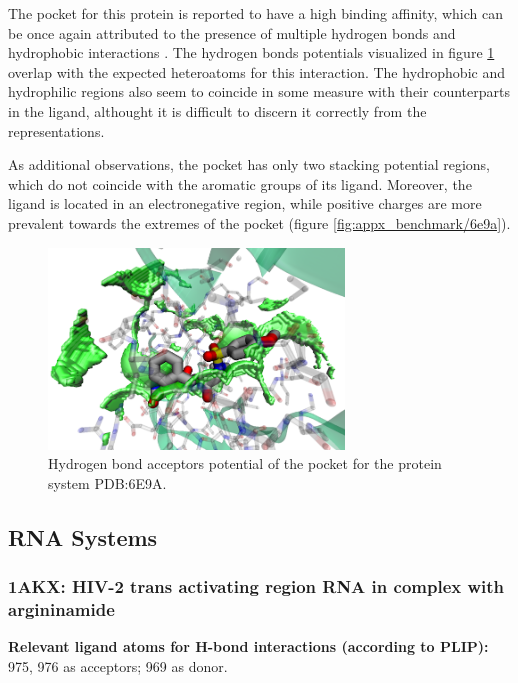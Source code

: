       The pocket for this protein is reported to have a high binding affinity, which can be once again attributed to the presence of multiple hydrogen bonds and hydrophobic interactions \cite{benchmark_6e9a_2018}. The hydrogen bonds potentials visualized in figure \ref{fig:benchmark/6e9a} overlap with the expected heteroatoms for this interaction. The hydrophobic and hydrophilic regions also seem to coincide in some measure with their counterparts in the ligand, althought it is difficult to discern it correctly from the representations.

      As additional observations, the pocket has only two stacking potential regions, which do not coincide with the aromatic groups of its ligand. Moreover, the ligand is located in an electronegative region, while positive charges are more prevalent towards the extremes of the pocket (figure \ref{fig:appx_benchmark/6e9a}).

      \begin{figure}[H]
        \centering
        \includegraphics[width=0.7\textwidth]{figures/results/benchmark_prot/6e9a.png}
        \caption{\label{fig:benchmark/6e9a} Hydrogen bond acceptors potential of the pocket for the protein system PDB:6E9A.}
      \end{figure}
    \pagebreak

  \subsection{RNA Systems}
    \subsubsection{1AKX: HIV-2 trans activating region RNA in complex with argininamide}
      \textbf{Relevant ligand atoms for H-bond interactions (according to PLIP):} 975, 976 as acceptors; 969 as donor.

